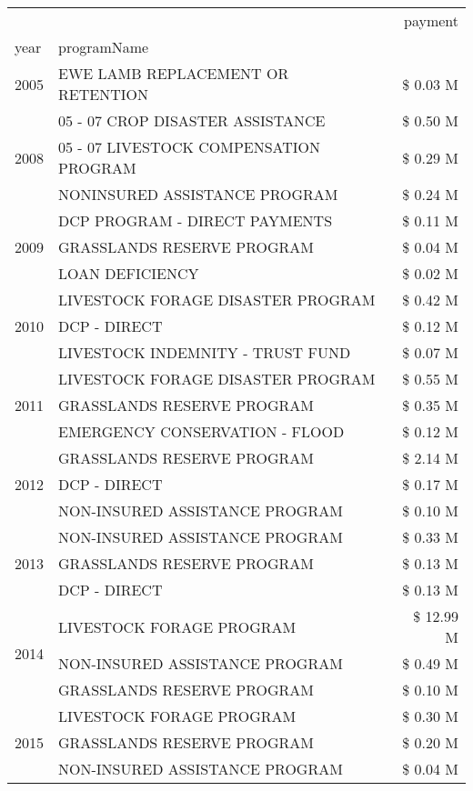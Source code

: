 \begin{tabular}{llr}
\toprule
 &  & payment \\
year & programName &  \\
\midrule
2005 & EWE LAMB REPLACEMENT OR RETENTION & \$ 0.03 M \\
\cline{1-3}
\multirow[t]{3}{*}{2008} & 05 - 07 CROP DISASTER ASSISTANCE & \$ 0.50 M \\
 & 05 - 07 LIVESTOCK COMPENSATION PROGRAM & \$ 0.29 M \\
 & NONINSURED ASSISTANCE PROGRAM & \$ 0.24 M \\
\cline{1-3}
\multirow[t]{3}{*}{2009} & DCP PROGRAM - DIRECT PAYMENTS & \$ 0.11 M \\
 & GRASSLANDS RESERVE PROGRAM & \$ 0.04 M \\
 & LOAN DEFICIENCY & \$ 0.02 M \\
\cline{1-3}
\multirow[t]{3}{*}{2010} & LIVESTOCK FORAGE DISASTER PROGRAM & \$ 0.42 M \\
 & DCP - DIRECT & \$ 0.12 M \\
 & LIVESTOCK INDEMNITY - TRUST FUND & \$ 0.07 M \\
\cline{1-3}
\multirow[t]{3}{*}{2011} & LIVESTOCK FORAGE DISASTER PROGRAM & \$ 0.55 M \\
 & GRASSLANDS RESERVE PROGRAM & \$ 0.35 M \\
 & EMERGENCY CONSERVATION - FLOOD & \$ 0.12 M \\
\cline{1-3}
\multirow[t]{3}{*}{2012} & GRASSLANDS RESERVE PROGRAM & \$ 2.14 M \\
 & DCP - DIRECT & \$ 0.17 M \\
 & NON-INSURED ASSISTANCE PROGRAM & \$ 0.10 M \\
\cline{1-3}
\multirow[t]{3}{*}{2013} & NON-INSURED ASSISTANCE PROGRAM & \$ 0.33 M \\
 & GRASSLANDS RESERVE PROGRAM & \$ 0.13 M \\
 & DCP - DIRECT & \$ 0.13 M \\
\cline{1-3}
\multirow[t]{3}{*}{2014} & LIVESTOCK FORAGE PROGRAM & \$ 12.99 M \\
 & NON-INSURED ASSISTANCE PROGRAM & \$ 0.49 M \\
 & GRASSLANDS RESERVE PROGRAM & \$ 0.10 M \\
\cline{1-3}
\multirow[t]{3}{*}{2015} & LIVESTOCK FORAGE PROGRAM & \$ 0.30 M \\
 & GRASSLANDS RESERVE PROGRAM & \$ 0.20 M \\
 & NON-INSURED ASSISTANCE PROGRAM & \$ 0.04 M \\

\end{tabular}
